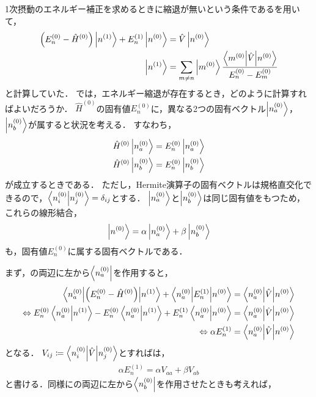 \documentclass{report}
\begin{document}
  1次摂動のエネルギー補正を求めるときに縮退が無いという条件であるを用いて，
  \begin{align}
    \qty(E_n^{(0)} - \hat{H}^{(0)})\ket{n^{(1)}} + E_n^{(1)}\ket{n^{(0)}} &= \hat{V}\ket{n^{(0)}} \label{1st-order-perturbation-re-before} \\
    \ket{n^{(1)}} &= \sum_{m\neq n}\ket{m^{(0)}}\frac{\mel**{m^{(0)}}{\hat{V}}{n^{(0)}}}{E_n^{(0)} - E_m^{(0)}}\label{1st-order-perturbation-re-after}
  \end{align}
  と計算していた．
  では，エネルギー縮退が存在するとき，どのように計算すればよいだろうか．
  $\hat{H}^{(0)}$の固有値$E_n^{(0)}$に，異なる2つの固有ベクトル$\ket{n_a^{(0)}}$，$\ket{n_b^{(0)}}$が属すると状況を考える．
  すなわち，
  \begin{align}
    \hat{H}^{(0)}\ket{n_a^{(0)}} &= E_n^{(0)}\ket{n_a^{(0)}} \\
    \hat{H}^{(0)}\ket{n_b^{(0)}} &= E_n^{(0)}\ket{n_b^{(0)}}
  \end{align}
  が成立するときである．
  ただし，Hermite演算子の固有ベクトルは規格直交化できるので，$\braket{n_i^{(0)}}{n_j^{(0)}} = \delta_{ij}$とする．
  $\ket{n_a^{(0)}}$と$\ket{n_b^{(0)}}$は同じ固有値をもつため，これらの線形結合，
  \begin{align}
    \ket{n^{(0)}} = \alpha\ket{n_a^{(0)}} + \beta\ket{n_b^{(0)}}\label{degeneracy-n0-def}
  \end{align}
  も，固有値$E_n^{(0)}$に属する固有ベクトルである．
  \par
  まず，の両辺に左から$\bra{n_a^{(0)}}$を作用すると，
  \begin{align}
    \mel**{n_a^{(0)}}{\qty(E_n^{(0)} - \hat{H}^{(0)})}{n^{(1)}} + \mel**{n_a^{(0)}}{E_n^{(1)}}{n^{(0)}} &= \mel**{n_a^{(0)}}{\hat{V}}{n^{(0)}} \\ 
    \Leftrightarrow E_n^{(0)}\braket{n_a^{(0)}}{n^{(1)}} - E_n^{(0)}\braket{n_a^{(0)}}{n^{(1)}} + E_n^{(1)}\braket{n_a^{(0)}}{n^{(0)}} &= \mel**{n_a^{(0)}}{\hat{V}}{n^{(0)}} \\ 
    \Leftrightarrow \alpha E_n^{(1)} &= \mel**{n_a^{(0)}}{\hat{V}}{n^{(0)}}\label{degeneracy-ket-alpha}
  \end{align}
  となる．
  $V_{ij} \coloneqq \mel**{n^{(0)}_i}{\hat{V}}{n^{(0)}_j}$とすればは，
  \begin{align}
    \alpha E_n^{(1)} = \alpha V_{aa} + \beta V_{ab}
  \end{align}
  と書ける．同様にの両辺に左から$\bra{n_b^{(0)}}$を作用させたときも考えれば，
\end{document}
